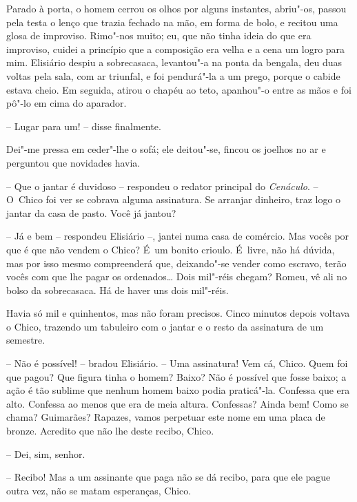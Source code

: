 Parado à porta, o homem cerrou os olhos por alguns instantes, abriu"-os,
passou pela testa o lenço que trazia fechado na mão, em forma de bolo, e
recitou uma glosa de improviso. Rimo"-nos muito; eu, que não tinha ideia
do que era improviso, cuidei a princípio que a composição era velha e a
cena um logro para mim. Elisiário despiu a sobrecasaca, levantou"-a na
ponta da bengala, deu duas voltas pela sala, com ar triunfal, e foi
pendurá"-la a um prego, porque o cabide estava cheio. Em seguida, atirou
o chapéu ao teto, apanhou"-o entre as mãos e foi pô"-lo em cima do
aparador.

-- Lugar para um! -- disse finalmente.

Dei"-me pressa em ceder"-lhe o sofá; ele deitou"-se, fincou os joelhos no
ar e perguntou que novidades havia.

-- Que o jantar é duvidoso -- respondeu o redator principal do
\emph{Cenáculo}. -- O~Chico foi ver se cobrava alguma assinatura. Se
arranjar dinheiro, traz logo o jantar da casa de pasto. Você já jantou?

-- Já e bem -- respondeu Elisiário --, jantei numa casa de comércio. Mas
vocês por que é que não vendem o Chico? É~um bonito crioulo. É~livre,
não há dúvida, mas por isso mesmo compreenderá que, deixando"-se vender
como escravo, terão vocês com que lhe pagar os ordenados\ldots{} Dois
mil"-réis chegam? Romeu, vê ali no bolso da sobrecasaca. Há de haver uns
dois mil"-réis.

Havia só mil e quinhentos, mas não foram precisos. Cinco minutos depois
voltava o Chico, trazendo um tabuleiro com o jantar e o resto da
assinatura de um semestre.

-- Não é possível! -- bradou Elisiário. -- Uma assinatura! Vem cá,
Chico. Quem foi que pagou? Que figura tinha o homem? Baixo? Não é
possível que fosse baixo; a ação é tão sublime que nenhum homem baixo
podia praticá"-la. Confessa que era alto. Confessa ao menos que era de
meia altura. Confessas? Ainda bem! Como se chama? Guimarães? Rapazes,
vamos perpetuar este nome em uma placa de bronze. Acredito que não lhe
deste recibo, Chico.

-- Dei, sim, senhor.

-- Recibo! Mas a um assinante que paga não se dá recibo, para que ele
pague outra vez, não se matam esperanças, Chico.

